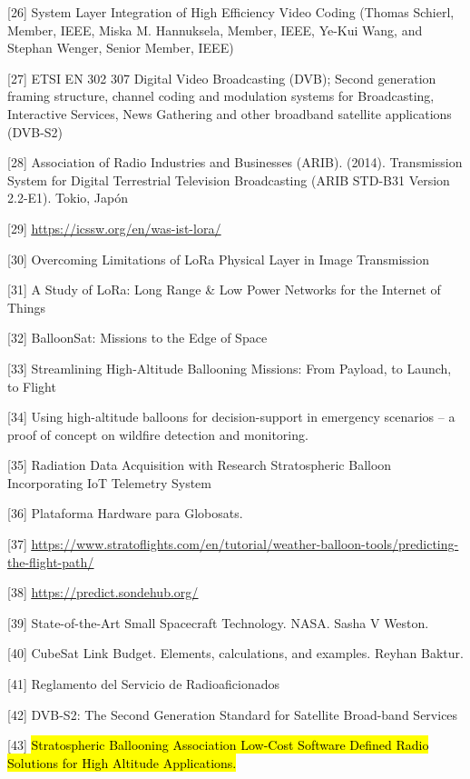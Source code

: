 \documentclass[12pt,a4paper]{article}
\begin{document}
{[}26{]} System Layer Integration of High Efficiency Video Coding (Thomas Schierl, Member, IEEE, Miska M. Hannuksela, Member, IEEE, Ye-Kui Wang, and Stephan Wenger, Senior Member, IEEE)

{[}27{]} ETSI EN 302 307 Digital Video Broadcasting (DVB); Second generation framing structure, channel coding and modulation systems for Broadcasting, Interactive Services, News Gathering and other broadband satellite applications (DVB-S2)

{[}28{]} Association of Radio Industries and Businesses (ARIB). (2014). Transmission System for Digital Terrestrial Television Broadcasting (ARIB STD-B31 Version 2.2-E1). Tokio, Japón

{[}29{]} \href{https://icssw.org/en/was-ist-lora/}{\ul{https://icssw.org/en/was-ist-lora/}}

{[}30{]} Overcoming Limitations of LoRa Physical Layer in Image Transmission

{[}31{]} A Study of LoRa: Long Range \& Low Power Networks for the Internet of Things

{[}32{]} BalloonSat: Missions to the Edge of Space

{[}33{]} Streamlining High-Altitude Ballooning Missions: From Payload, to Launch, to Flight

{[}34{]} Using high-altitude balloons for decision-support in emergency scenarios -- a proof of concept on wildfire detection and monitoring.

{[}35{]} Radiation Data Acquisition with Research Stratospheric Balloon Incorporating IoT Telemetry System

{[}36{]} Plataforma Hardware para Globosats.

{[}37{]} \href{https://www.stratoflights.com/en/tutorial/weather-balloon-tools/predicting-the-flight-path/}{\ul{https://www.stratoflights.com/en/tutorial/weather-balloon-tools/predicting-the-flight-path/}}

{[}38{]} \href{https://predict.sondehub.org/}{\ul{https://predict.sondehub.org/}}

{[}39{]} State-of-the-Art Small Spacecraft Technology. NASA. Sasha V Weston.

{[}40{]} CubeSat Link Budget. Elements, calculations, and examples. Reyhan Baktur.

{[}41{]} Reglamento del Servicio de Radioaficionados

{[}42{]} DVB-S2: The Second Generation Standard for Satellite Broad-band Services

{[}43{]} \hl{Stratospheric Ballooning Association Low-Cost Software Defined Radio Solutions for High Altitude Applications.}
\end{document}
